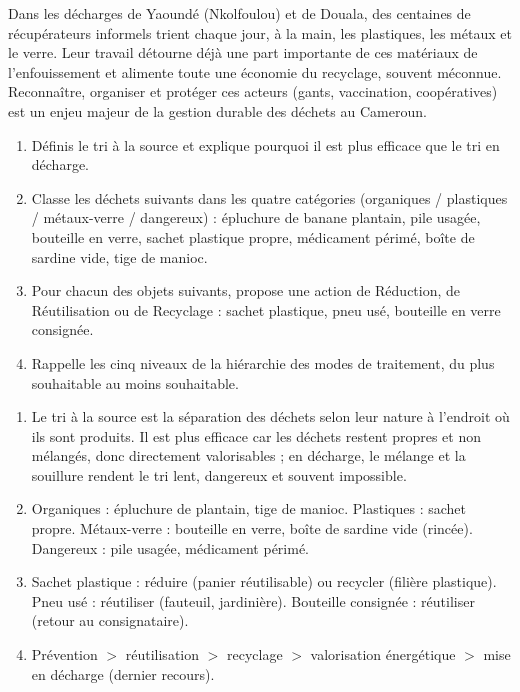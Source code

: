 \documentclass[11pt]{article}
\begin{document}
\begin{savaistu}
Dans les décharges de Yaoundé (Nkolfoulou) et de Douala, des centaines de récupérateurs informels trient chaque jour, à la main, les plastiques, les métaux et le verre. Leur travail détourne déjà une part importante de ces matériaux de l'enfouissement et alimente toute une économie du recyclage, souvent méconnue. Reconnaître, organiser et protéger ces acteurs (gants, vaccination, coopératives) est un enjeu majeur de la gestion durable des déchets au Cameroun.
\end{savaistu}

\begin{exercice}
\begin{enumerate}
\item Définis le tri à la source et explique pourquoi il est plus efficace que le tri en décharge.
\item Classe les déchets suivants dans les quatre catégories (organiques / plastiques / métaux-verre / dangereux) : épluchure de banane plantain, pile usagée, bouteille en verre, sachet plastique propre, médicament périmé, boîte de sardine vide, tige de manioc.
\item Pour chacun des objets suivants, propose une action de Réduction, de Réutilisation ou de Recyclage : sachet plastique, pneu usé, bouteille en verre consignée.
\item Rappelle les cinq niveaux de la hiérarchie des modes de traitement, du plus souhaitable au moins souhaitable.
\end{enumerate}
\end{exercice}

\begin{corrige}
\begin{enumerate}
\item Le tri à la source est la séparation des déchets selon leur nature à l'endroit où ils sont produits. Il est plus efficace car les déchets restent propres et non mélangés, donc directement valorisables ; en décharge, le mélange et la souillure rendent le tri lent, dangereux et souvent impossible.
\item Organiques : épluchure de plantain, tige de manioc. Plastiques : sachet propre. Métaux-verre : bouteille en verre, boîte de sardine vide (rincée). Dangereux : pile usagée, médicament périmé.
\item Sachet plastique : réduire (panier réutilisable) ou recycler (filière plastique). Pneu usé : réutiliser (fauteuil, jardinière). Bouteille consignée : réutiliser (retour au consignataire).
\item Prévention $>$ réutilisation $>$ recyclage $>$ valorisation énergétique $>$ mise en décharge (dernier recours).
\end{enumerate}
\end{corrige}
\end{document}
